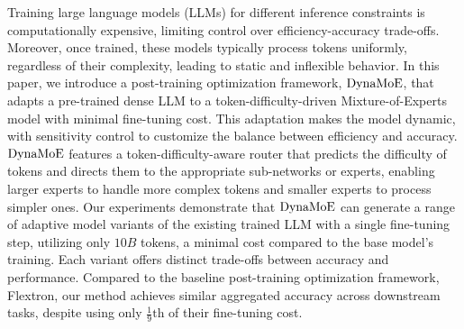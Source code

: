 


Training large language models (LLMs) for different inference constraints is computationally expensive, limiting control over efficiency-accuracy trade-offs. Moreover, once trained, these models typically process tokens uniformly, regardless of their complexity, leading to static and inflexible behavior. In this paper, we introduce a post-training optimization framework, $\operatorname{DynaMoE}$, that adapts a pre-trained dense LLM to a token-difficulty-driven Mixture-of-Experts model with minimal fine-tuning cost. This adaptation makes the model dynamic, with sensitivity control to customize the balance between efficiency and accuracy. $\operatorname{DynaMoE}$ features a token-difficulty-aware router that predicts the difficulty of tokens and directs them to the appropriate sub-networks or experts, enabling larger experts to handle more complex tokens and smaller experts to process simpler ones. Our experiments demonstrate that $\operatorname{DynaMoE}$ can generate a range of adaptive model variants of the existing trained LLM with a single fine-tuning step, utilizing only $10B$ tokens, a minimal cost compared to the base model's training. Each variant offers distinct trade-offs between accuracy and performance. Compared to the baseline post-training optimization framework, Flextron, our method  achieves similar aggregated accuracy across downstream tasks, despite using only $\frac{1}{9}\text{th}$ of their fine-tuning cost.







